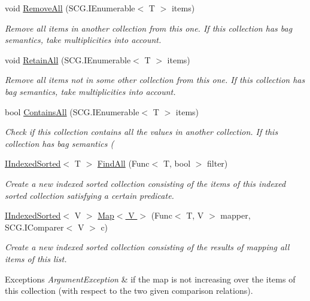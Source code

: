 \begin{DoxyCompactItemize}
void \hyperlink{class_c5_1_1_tree_bag_a2e37aa0e335a6b94842841e692b3f59a}{Remove\+All} (S\+C\+G.\+I\+Enumerable$<$ T $>$ items)
\begin{DoxyCompactList}\small\item\em Remove all items in another collection from this one. If this collection has bag semantics, take multiplicities into account. \end{DoxyCompactList}\item 
void \hyperlink{class_c5_1_1_tree_bag_a5e94ab2d0e81d3834d60824482a5568c}{Retain\+All} (S\+C\+G.\+I\+Enumerable$<$ T $>$ items)
\begin{DoxyCompactList}\small\item\em Remove all items not in some other collection from this one. If this collection has bag semantics, take multiplicities into account. \end{DoxyCompactList}\item 
bool \hyperlink{class_c5_1_1_tree_bag_ada5a4e4666a76bb810a722cea086e336}{Contains\+All} (S\+C\+G.\+I\+Enumerable$<$ T $>$ items)
\begin{DoxyCompactList}\small\item\em Check if this collection contains all the values in another collection. If this collection has bag semantics ( \end{DoxyCompactList}\item 
\hyperlink{interface_c5_1_1_i_indexed_sorted}{I\+Indexed\+Sorted}$<$ T $>$ \hyperlink{class_c5_1_1_tree_bag_aa4ab7a89e8d9af71d553cfad2d51da82}{Find\+All} (Func$<$ T, bool $>$ filter)
\begin{DoxyCompactList}\small\item\em Create a new indexed sorted collection consisting of the items of this indexed sorted collection satisfying a certain predicate. \end{DoxyCompactList}\item 
\hyperlink{interface_c5_1_1_i_indexed_sorted}{I\+Indexed\+Sorted}$<$ V $>$ \hyperlink{class_c5_1_1_tree_bag_ace9916501236d54cca727f0d498d26c3}{Map$<$ V $>$} (Func$<$ T, V $>$ mapper, S\+C\+G.\+I\+Comparer$<$ V $>$ c)
\begin{DoxyCompactList}\small\item\em Create a new indexed sorted collection consisting of the results of mapping all items of this list. 
\begin{DoxyExceptions}{Exceptions}
{\em Argument\+Exception} & if the map is not increasing over the items of this collection (with respect to the two given comparison relations). \\

\end{DoxyExceptions}
\end{DoxyCompactList}
\end{DoxyCompactItemize}
